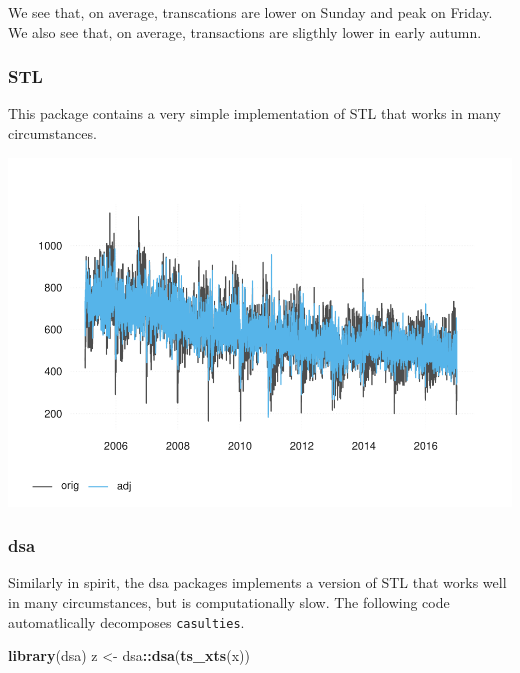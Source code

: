 \documentclass[
]{article}
\newenvironment{Shaded}{\begin{snugshade}}{\end{snugshade}}
\newcommand{\KeywordTok}[1]{\textcolor[rgb]{0.13,0.29,0.53}{\textbf{#1}}}
\newcommand{\NormalTok}[1]{#1}
\newcommand{\OperatorTok}[1]{\textcolor[rgb]{0.81,0.36,0.00}{\textbf{#1}}}
\newcommand{\StringTok}[1]{\textcolor[rgb]{0.31,0.60,0.02}{#1}}
\begin{document}
We see that, on average, transcations are lower on Sunday and peak on
Friday. We also see that, on average, transactions are sligthly lower in
early autumn.

\hypertarget{stl}{%
\subsubsection{STL}\label{stl}}

This package contains a very simple implementation of STL that works in
many circumstances.

\begin{Shaded}
\end{Shaded}

\includegraphics{overview_files/figure-latex/stl-1.pdf}

\hypertarget{dsa}{%
\subsubsection{dsa}\label{dsa}}

Similarly in spirit, the dsa packages implements a version of STL that
works well in many circumstances, but is computationally slow. The
following code automatlically decomposes \texttt{casulties}.

\begin{Shaded}
\begin{Highlighting}[]
\KeywordTok{library}\NormalTok{(dsa)}
\NormalTok{z <-}\StringTok{ }\NormalTok{dsa}\OperatorTok{::}\KeywordTok{dsa}\NormalTok{(}\KeywordTok{ts_xts}\NormalTok{(x))}
\end{Highlighting}
\end{Shaded}
\end{document}
